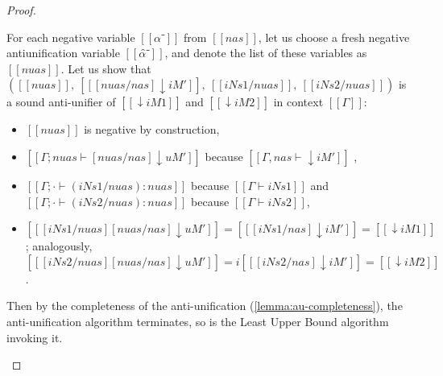 \begin{proof}
\begin{caseof}
    For each negative variable $[[α⁻]]$ from $[[nas]]$, let us choose a
    fresh negative antiunification variable $[[α̂⁻]]$, and denote the
    list of these variables as $[[nuas]]$.
    Let us show that $([[nuas]],~ [[ [nuas/nas]↓iM' ]],~ [[iNs1/nuas]],~ [[iNs2/nuas]])$ is a
    sound anti-unifier of $[[↓iM1]]$ and $[[↓iM2]]$ in context $[[Γ]]$:

    \begin{itemize}
      \item $[[nuas]]$ is negative by construction,
      \item $[[Γ ; nuas ⊢ [nuas/nas]↓uM']]$ because $[[Γ, nas ⊢ ↓iM']]$ ,
      \item $[[Γ ; · ⊢ (iNs1/nuas) : nuas]]$ because $[[Γ ⊢ iNs1]]$ and
        $[[Γ ; · ⊢ (iNs2/nuas) : nuas]]$ because $[[Γ ⊢ iNs2]]$,
      \item $[[ [iNs1/nuas] [nuas/nas] ↓uM' ]] = [[ [iNs1/nas] ↓iM' ]] =
        [[↓iM1]]$; analogously, $[[ [iNs2/nuas] [nuas/nas] ↓uM' ]] =i
        [[ [iNs2/nas] ↓iM' ]] = [[↓iM2]]$.
    \end{itemize}

    Then by the completeness of the anti-unification
    (\cref{lemma:au-completeness}), the anti-unification algorithm
    terminates, so is the Least Upper Bound algorithm invoking it.

  \end{caseof}
\end{proof}

